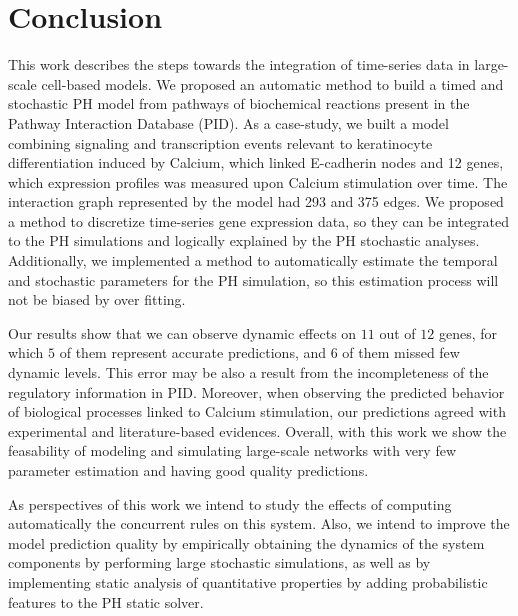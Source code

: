 \section{Conclusion}
This work describes the steps towards the integration of time-series data in large-scale cell-based models. 
We proposed an automatic method to build a timed and stochastic PH model from pathways of biochemical reactions present in 
the Pathway Interaction Database (PID). 
%
As a case-study, we built a model combining signaling and transcription events relevant to keratinocyte differentiation induced by Calcium, which linked E-cadherin nodes and 12 genes, which 
expression profiles was measured upon Calcium stimulation over time. The interaction graph represented by the model had 293 and 375 edges.
%
We proposed a method to discretize time-series gene expression data, so they can be integrated to the PH simulations and logically explained by the PH stochastic analyses. 
%
Additionally, we implemented a method to automatically estimate the temporal and stochastic
parameters for the PH simulation, so this estimation process will not be biased by over fitting. 
%

Our results show that  we can observe dynamic effects on $11$ out of $12$ genes, for which $5$ of them represent accurate predictions, and $6$ of them missed few dynamic levels.
This error may be also a result from the incompleteness of the regulatory information in PID.
Moreover, when observing the predicted behavior of biological processes linked to Calcium stimulation, our predictions agreed with experimental and literature-based evidences.
Overall, with this work we show the feasability of modeling and simulating large-scale networks with very few parameter estimation 
and having good quality predictions.

As perspectives of this work we intend to study the effects of computing automatically the concurrent rules on this system.
Also, we intend to improve the model prediction quality by empirically obtaining the dynamics of the system components by performing large stochastic simulations, as well 
as by implementing static analysis of quantitative properties by adding probabilistic features to the PH static solver.

